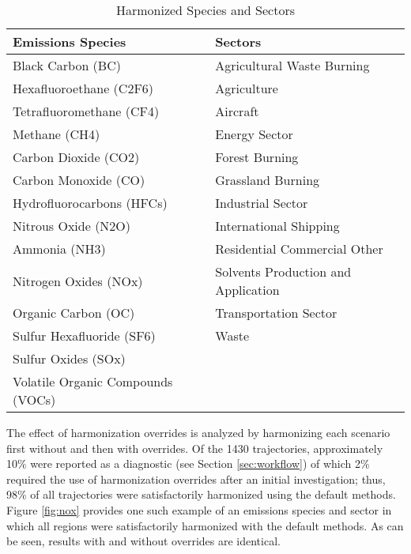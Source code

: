 \begin{table}[]
  \centering
  \caption{Harmonized Species and Sectors}
  \label{tab:sp}
  \begin{tabular}{|l|l|}
    \hline
    \textbf{Emissions Species}        & \textbf{Sectors}                    \\
    \hline
    Black Carbon (BC)                 & Agricultural Waste Burning          \\
    Hexafluoroethane (C2F6)           & Agriculture                         \\
    Tetrafluoromethane (CF4)          & Aircraft                            \\
    Methane (CH4)                     & Energy Sector                       \\
    Carbon Dioxide (CO2)              & Forest Burning                      \\
    Carbon Monoxide (CO)              & Grassland Burning                   \\
    Hydrofluorocarbons (HFCs)         & Industrial Sector                   \\
    Nitrous Oxide (N2O)               & International Shipping              \\
    Ammonia (NH3)                     & Residential Commercial Other        \\
    Nitrogen Oxides (NOx)             & Solvents Production and Application \\
    Organic Carbon (OC)               & Transportation Sector               \\
    Sulfur Hexafluoride (SF6)         & Waste                               \\
    Sulfur Oxides (SOx)               &                                     \\
    Volatile Organic Compounds (VOCs) &                                     \\
    \hline
  \end{tabular}
\end{table}

The effect of harmonization overrides is analyzed by harmonizing each scenario
first without and then with overrides. Of the 1430 trajectories, approximately
10\% were reported as a diagnostic (see Section \ref{sec:workflow}) of which 2\%
required the use of harmonization overrides after an initial investigation;
thus, 98\% of all trajectories were satisfactorily harmonized using the default
methods. Figure \ref{fig:nox} provides
one such example of an emissions species and sector in which all regions were
satisfactorily harmonized with the default methods. As can be seen, results with
and without overrides are identical.

